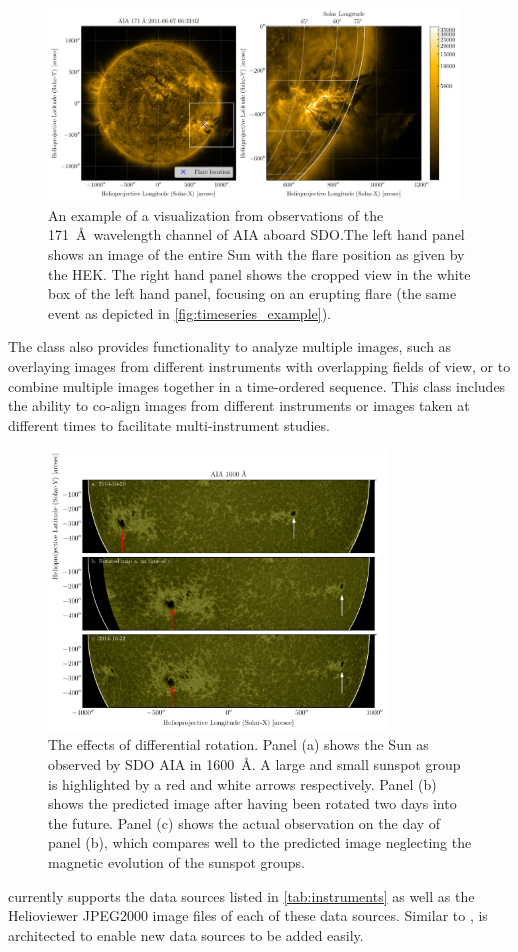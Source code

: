 \begin{figure}
    \centering
    \includegraphics[width=0.97\textwidth]{figures/map_example.pdf}
    \caption{An example of a \Map visualization from observations of the 171~\AA\ wavelength channel of AIA aboard SDO.The left hand panel shows an image of the entire Sun with the flare position as given by the HEK. The right hand panel shows the cropped view in the white box of the left hand panel, focusing on an erupting flare (the same event as depicted in \autoref{fig:timeseries_example}).}
    \label{fig:map_example}
\end{figure}

The \Map class also provides functionality to analyze multiple images, such as overlaying images from different instruments with overlapping fields of view, or to combine multiple images together in a time-ordered sequence.
This class includes the ability to co-align images from different instruments or images taken at different times to facilitate multi-instrument studies.


\begin{figure}
    \center
    \includegraphics[width = 0.8\textwidth]{figures/fig_diff_rot_1600.pdf}
    \caption{The effects of differential rotation.
    Panel (a) shows the Sun as observed by SDO AIA in 1600~\AA{}.
    A large and small sunspot group is highlighted by a red and white arrows respectively.
    Panel (b) shows the predicted image after having been rotated two days into the future.
    Panel (c) shows the actual observation on the day of panel (b), which compares well to the predicted image neglecting the magnetic evolution of the sunspot groups.}
    \label{fig:diff_rot}
\end{figure}

\Map currently supports the data sources listed in \autoref{tab:instruments} as well as the Helioviewer JPEG2000 image files of  each of these data sources.
Similar to \Timeseries, \Map is architected to enable new data sources to be added easily.
